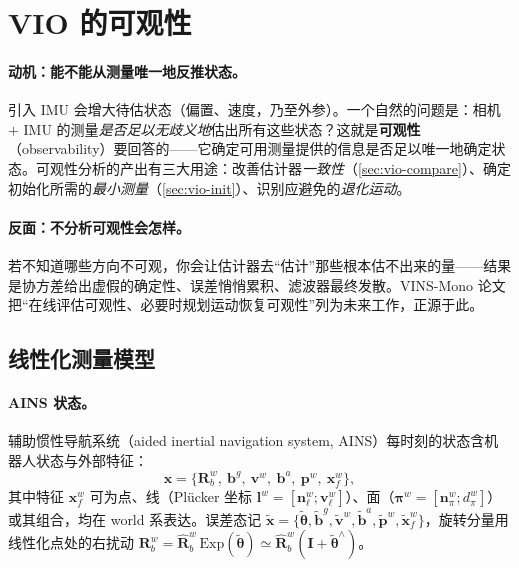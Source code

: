 \section{VIO 的可观性}
\label{sec:vio-obs}

\paragraph{动机：能不能从测量唯一地反推状态。}
引入 IMU 会增大待估状态（偏置、速度，乃至外参）。一个自然的问题是：相机 $+$ IMU 的测量\emph{是否足以无歧义地}估出所有这些状态？这就是\textbf{可观性}（observability）要回答的——它确定可用测量提供的信息是否足以唯一地确定状态\cite{carlone2026handbook,huang2019vins}。可观性分析的产出有三大用途：改善估计器\emph{一致性}（\cref{sec:vio-compare}）、确定初始化所需的\emph{最小测量}（\cref{sec:vio-init}）、识别应避免的\emph{退化运动}。

\paragraph{反面：不分析可观性会怎样。}
若不知道哪些方向不可观，你会让估计器去“估计”那些根本估不出来的量——结果是协方差给出虚假的确定性、误差悄悄累积、滤波器最终发散。VINS-Mono 论文\cite{qin2018vins} 把“在线评估可观性、必要时规划运动恢复可观性”列为未来工作，正源于此。

\subsection{线性化测量模型}
\label{sec:vio-obs-model}

\paragraph{AINS 状态。}
辅助惯性导航系统（aided inertial navigation system, AINS）每时刻的状态含机器人状态与外部特征\cite{carlone2026handbook}：
\begin{equation}
  \boldsymbol{x}=\{\mathbf{R}^w_b,\ \mathbf{b}^g,\ \mathbf{v}^w,\ \mathbf{b}^a,\ \mathbf{p}^w,\ \boldsymbol{x}^w_f\},
  \label{eq:vio-ains-state}
\end{equation}
其中特征 $\boldsymbol{x}^w_f$ 可为点、线（Plücker 坐标 $\mathbf{l}^w=[\mathbf{n}_\ell^w;\mathbf{v}_\ell^w]$）、面（$\boldsymbol{\pi}^w=[\mathbf{n}_\pi^w;d_\pi^w]$）或其组合，均在 world 系表达。误差态记 $\tilde{\boldsymbol{x}}=\{\tilde{\boldsymbol{\theta}},\tilde{\mathbf{b}}^g,\tilde{\mathbf{v}}^w,\tilde{\mathbf{b}}^a,\tilde{\mathbf{p}}^w,\tilde{\boldsymbol{x}}^w_f\}$，旋转分量用线性化点处的右扰动 $\mathbf{R}^w_b=\hat{\mathbf{R}}^w_b\,\mathrm{Exp}(\tilde{\boldsymbol{\theta}})\simeq\hat{\mathbf{R}}^w_b(\mathbf{I}+\tilde{\boldsymbol{\theta}}^\wedge)$。

